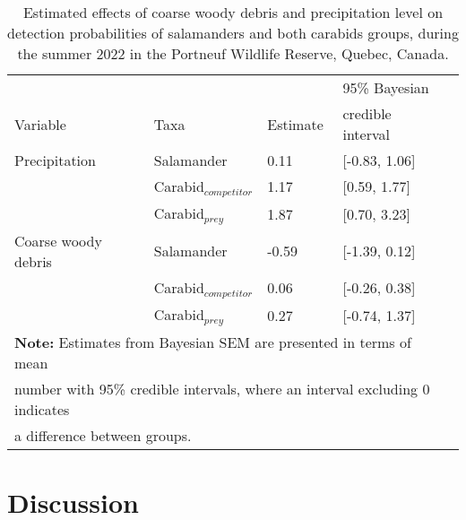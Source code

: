 \vspace{0.5cm}

\begin{table}[ht]
  \centering
  \caption[Estimated effects of coarse woody debris and precipitation level on detection probabilities of salamanders and both carabids groups.]
  {Estimated effects of coarse woody debris and precipitation level on detection probabilities of salamanders and both carabids groups, during the summer 2022 in the Portneuf Wildlife Reserve,  Quebec, Canada.}
  \label{tab:detection}
  \begin{tabular}{lllll} 
      \hline
      &&&95\% Bayesian \\
      Variable & Taxa & Estimate &  credible interval \\ [0.5ex] 
      \hline      
      Precipitation       & Salamander              & \hspace{1mm}0.11 & [-0.83, 1.06] \\ 
                          & Carabid$_{competitor}$  & \hspace{1mm}1.17 & [0.59, 1.77] \\ 
                          & Carabid$_{prey}$        & \hspace{1mm}1.87 & [0.70, 3.23] \\       
      Coarse woody debris & Salamander              & -0.59 & [-1.39, 0.12] \\ 
                          & Carabid$_{competitor}$  & \hspace{1mm}0.06 & [-0.26, 0.38] \\ 
                          & Carabid$_{prey}$        & \hspace{1mm}0.27 & [-0.74, 1.37] \\   

      \hline
      \multicolumn{4}{l}{\textbf{Note:} Estimates from Bayesian SEM are presented in terms of mean} \\
      \multicolumn{4}{l}{number with 95\% credible intervals, where an interval excluding 0 indicates} \\
      \multicolumn{4}{l}{a difference between groups.} \\
  \end{tabular}
\end{table}

\clearpage

\section*{Discussion}
\label{sec:discu1}

